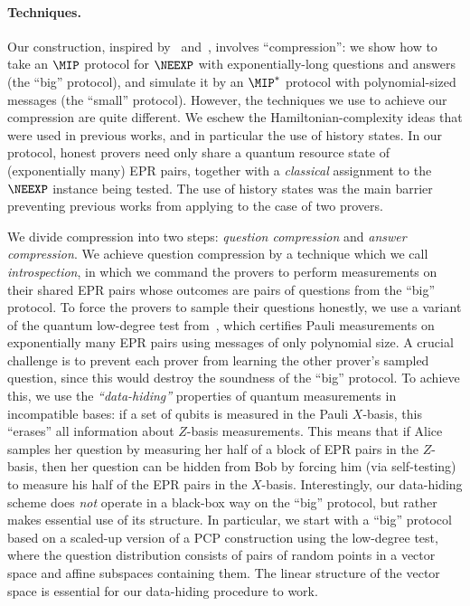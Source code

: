 \documentclass[11pt]{article}
\begin{document}
\paragraph{Techniques.}

Our construction, inspired by~\cite{Ji17}
and~\cite{FJVY19}, involves ``compression'': we show how to take an $\MIP$ protocol for $\NEEXP$
with exponentially-long questions and answers (the ``big'' protocol),
and simulate it by an $\MIP^*$ protocol with polynomial-sized messages (the ``small''
protocol). However, the techniques we use to achieve our compression
are quite different. We
eschew the Hamiltonian-complexity ideas that were used in previous
works, and in particular the use of history states. In our protocol,
honest provers need only share a quantum resource state of (exponentially
many) EPR pairs, together with a \emph{classical} assignment to the
$\NEEXP$ instance being tested. The use of history states was the main
barrier preventing previous works from applying to the case of
two provers. 

We
divide compression into two steps: \emph{question compression} and
\emph{answer compression}. We
achieve question compression by a technique which we call
\emph{introspection}, in which we command the provers to perform
measurements on their shared EPR pairs whose outcomes are pairs of questions
from the ``big'' protocol. To force the provers to sample their
questions honestly, we use a variant of the quantum low-degree test
from~\cite{NV18a}, which certifies Pauli measurements on exponentially
many EPR pairs using messages of only polynomial size. A crucial
challenge is to prevent each prover from learning the other prover's
sampled question, since this would destroy the soundness of the
``big'' protocol. To achieve this, we use the \emph{``data-hiding''} properties of quantum measurements
in incompatible bases: if a set of qubits is measured in the Pauli $X$-basis,
this ``erases'' all information about $Z$-basis
measurements. This means that if Alice samples her question by
measuring her half of a block of EPR pairs in the $Z$-basis, then her question can
be hidden from Bob by forcing him (via self-testing) to measure his
half of the EPR pairs in the $X$-basis. Interestingly, our data-hiding scheme
does \emph{not} operate in a black-box way on the ``big'' protocol, but
rather makes essential use of its structure. In particular, we start
with a ``big'' protocol based on a scaled-up version of a PCP
construction using the low-degree test, where the question
distribution consists of pairs of random points in a vector space and
affine subspaces containing them. The linear structure of the vector
space is essential for our data-hiding procedure to work.
\end{document}
